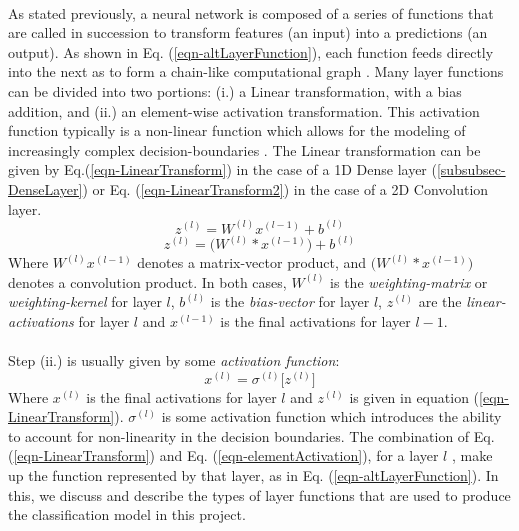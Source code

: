 \documentclass[12pt,letterpaper]{article}
\begin{document}
\paragraph*{}As stated previously, a neural network is composed of a series of functions that are called in succession to transform features (an input) into a predictions (an output). As shown in Eq. (\ref{eqn-altLayerFunction}), each function feeds directly into the next as to form a chain-like computational graph \cite{Goodfellow}. Many layer functions can be divided into two portions: (i.) a Linear transformation, with a bias addition, and (ii.) an element-wise activation transformation. This activation function typically is a non-linear function which allows for the modeling of increasingly complex decision-boundaries \cite{Geron,Loy}. The Linear transformation can be given by Eq.(\ref{eqn-LinearTransform}) in the case of a 1D Dense layer (\ref{subsubsec-DenseLayer}) or Eq. (\ref{eqn-LinearTransform2}) in the case of a 2D Convolution layer.
\begin{equation}
\label{eqn-LinearTransform}
z^{(l)} = W^{(l)} x^{(l-1)} + b^{(l)}
\end{equation}
\begin{equation}
\label{eqn-LinearTransform2}
z^{(l)} = \big(W^{(l)} * x^{(l-1)}\big) + b^{(l)}
\end{equation} 
Where $W^{(l)} x^{(l-1)}$ denotes a matrix-vector product, and $\big(W^{(l)} * x^{(l-1)}\big)$ denotes a convolution product. In both cases, $W^{(l)}$ is the \textit{weighting-matrix} or \textit{weighting-kernel} for layer $l$, $b^{(l)}$ is the \textit{bias-vector} for layer $l$, $z^{(l)}$ are the \textit{linear-activations} for layer $l$ and $x^{(l-1)}$ is the final activations for layer $l-1$.

\paragraph*{}Step (ii.) is usually given by some \textit{activation function}:
\begin{equation}
\label{eqn-elementActivation}
x^{(l)} = \sigma^{(l)} \big[ z^{(l)} \big]
\end{equation}
Where $x^{(l)}$ is the final activations for layer $l$ and $z^{(l)}$ is given in equation (\ref{eqn-LinearTransform}). $\sigma^{(l)}$ is some activation function which introduces the ability to account for non-linearity in the decision boundaries. The combination of Eq. (\ref{eqn-LinearTransform}) and Eq. (\ref{eqn-elementActivation}), for a layer $l$ , make up the function represented by that layer, as in Eq. (\ref{eqn-altLayerFunction}). In this, we discuss and describe the types of layer functions that are used to produce the classification model in this project.
\end{document}
